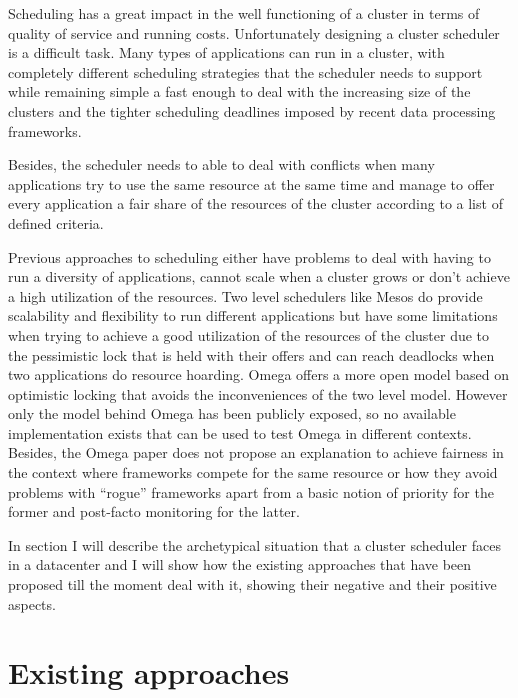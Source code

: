 \documentclass{svjour3}                     %
\begin{document}

Scheduling has a great impact in the well functioning of a cluster in
terms of quality of service and running costs.  Unfortunately
designing a cluster scheduler is a difficult task. Many types
of applications can run in a cluster, with completely different
scheduling strategies that the scheduler needs to support while
remaining simple a fast enough to deal with the increasing size of
the clusters and the tighter scheduling deadlines imposed by recent
data processing frameworks.

Besides, the scheduler needs to able to deal with conflicts when many
applications try to use the same resource at the same time and manage
to offer every application a fair share of the resources of the cluster
according to a list of defined criteria.

Previous approaches to scheduling either have problems to deal with 
having to run a diversity of applications, cannot scale when a cluster
grows or don't achieve a high utilization of the resources. Two level 
schedulers like Mesos \cite{Hindman10mesos:a} do provide scalability 
and flexibility to run different applications but have some limitations when
trying to achieve a good utilization of the resources of the cluster
due to the pessimistic lock that is held with their offers and can reach
deadlocks when two applications do resource hoarding. Omega \cite{41684}
offers a more open model based on optimistic locking that avoids the 
inconveniences of the two level model. However only the model behind Omega
has been publicly exposed, so no available implementation exists that can
be used to test Omega in different contexts. Besides, the Omega paper
does not propose an explanation to achieve fairness in the context where
frameworks compete for the same resource or how they avoid problems with
``rogue'' frameworks apart from a basic notion of priority for the former 
and post-facto monitoring for the latter.



In section  I will describe the archetypical situation
that a cluster scheduler faces in a datacenter and I will show how the
existing approaches that have been proposed till the moment deal with it,
showing their negative and their positive aspects.




\section{Existing approaches}
\label{approaches}
\end{document}
